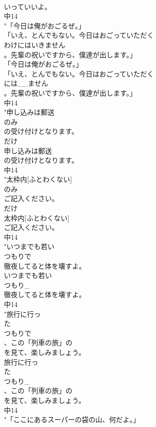 \documentclass[8pt]{extreport}
\begin{document}
\begin{CJK}{UTF8}{min}
\\	いっていいよ。
\\	中14
\\	"「今日は俺がおごるぜ。」
\\	「いえ、とんでもない。今日はおごっていただく
\\	わけにはいきません
\\	。先輩の祝いですから、僕達が出します。」
\\	「今日は俺がおごるぜ。」
\\	「いえ、とんでもない。今日はおごっていただく
\\	には__ません
\\	。先輩の祝いですから、僕達が出します。」
\\	中14
\\	"申し込みは郵送
\\	のみ
\\	の受け付けとなります。
\\	だけ 
\\	申し込みは郵送
\\	の受け付けとなります。
\\	中14
\\	"太枠内[ふとわくない]
\\	のみ
\\	ご記入ください。
\\	だけ 
\\	太枠内[ふとわくない]
\\	ご記入ください。
\\	中14
\\	"いつまでも若い
\\	つもりで
\\	徹夜してると体を壊すよ。
\\	いつまでも若い
\\	つもり_
\\	徹夜してると体を壊すよ。
\\	中14
\\	"旅行に行っ
\\	た
\\	つもりで
\\	、この「列車の旅」の
\\	を見て、楽しみましょう。
\\	旅行に行っ
\\	た
\\	つもり_
\\	、この「列車の旅」の
\\	を見て、楽しみましょう。
\\	中14
\\	"「ここにあるスーパーの袋の山、何だよ。」

\end{CJK}
\end{document}
